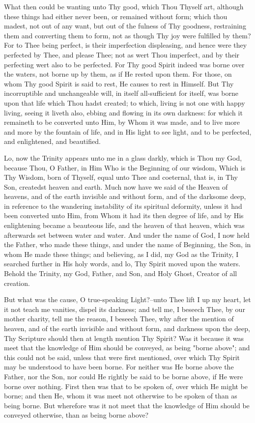 \documentclass[b5paper,openright,12pt,twoside]{book}
\begin{document}
What then could be wanting unto Thy good, which Thou Thyself art,
although these things had either never been, or remained without form;
which thou madest, not out of any want, but out of the fulness of Thy
goodness, restraining them and converting them to form, not as though
Thy joy were fulfilled by them? For to Thee being perfect, is their
imperfection displeasing, and hence were they perfected by Thee, and
please Thee; not as wert Thou imperfect, and by their perfecting wert
also to be perfected. For Thy good Spirit indeed was borne over the
waters, not borne up by them, as if He rested upon them. For those, on
whom Thy good Spirit is said to rest, He causes to rest in Himself. But
Thy incorruptible and unchangeable will, in itself all-sufficient for
itself, was borne upon that life which Thou hadst created; to which,
living is not one with happy living, seeing it liveth also, ebbing and
flowing in its own darkness: for which it remaineth to be converted unto
Him, by Whom it was made, and to live more and more by the fountain
of life, and in His light to see light, and to be perfected, and
enlightened, and beautified.

Lo, now the Trinity appears unto me in a glass darkly, which is Thou my
God, because Thou, O Father, in Him Who is the Beginning of our wisdom,
Which is Thy Wisdom, born of Thyself, equal unto Thee and coeternal,
that is, in Thy Son, createdst heaven and earth. Much now have we said
of the Heaven of heavens, and of the earth invisible and without form,
and of the darksome deep, in reference to the wandering instability of
its spiritual deformity, unless it had been converted unto Him, from
Whom it had its then degree of life, and by His enlightening became a
beauteous life, and the heaven of that heaven, which was afterwards
set between water and water. And under the name of God, I now held the
Father, who made these things, and under the name of Beginning, the Son,
in whom He made these things; and believing, as I did, my God as the
Trinity, I searched further in His holy words, and lo, Thy Spirit moved
upon the waters. Behold the Trinity, my God, Father, and Son, and Holy
Ghost, Creator of all creation.

But what was the cause, O true-speaking Light?--unto Thee lift I up my
heart, let it not teach me vanities, dispel its darkness; and tell me, I
beseech Thee, by our mother charity, tell me the reason, I beseech Thee,
why after the mention of heaven, and of the earth invisible and without
form, and darkness upon the deep, Thy Scripture should then at length
mention Thy Spirit? Was it because it was meet that the knowledge of Him
should be conveyed, as being "borne above"; and this could not be
said, unless that were first mentioned, over which Thy Spirit may
be understood to have been borne. For neither was He borne above the
Father, nor the Son, nor could He rightly be said to be borne above, if
He were borne over nothing. First then was that to be spoken of, over
which He might be borne; and then He, whom it was meet not otherwise to
be spoken of than as being borne. But wherefore was it not meet that
the knowledge of Him should be conveyed otherwise, than as being borne
above?
\end{document}
